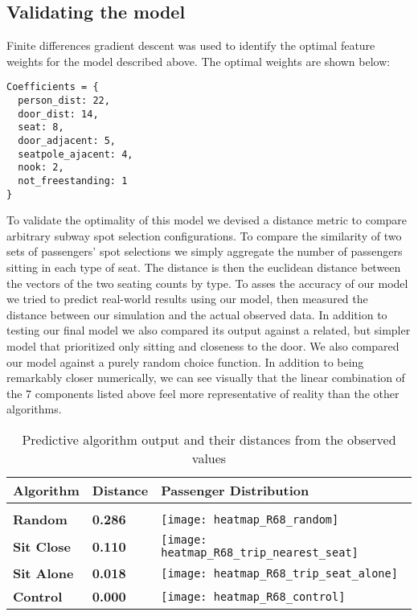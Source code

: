 \documentclass{acm_proc_article-sp}
\begin{document}
\subsection{Validating the model}
  Finite differences gradient descent\cite{flaxman2005online} was used to identify the optimal feature weights for the model described above. The optimal weights are shown below:
  \begin{lstlisting}
Coefficients = {
  person_dist: 22,
  door_dist: 14,
  seat: 8,
  door_adjacent: 5,
  seatpole_ajacent: 4,
  nook: 2,
  not_freestanding: 1
}
\end{lstlisting}

To validate the optimality of this model we devised a distance metric to compare arbitrary subway spot selection configurations. To compare the similarity of two sets of passengers' spot selections we simply aggregate the number of passengers sitting in each type of seat. The distance is then the euclidean distance between the vectors of the two seating counts by type. To asses the accuracy of our model we tried to predict real-world results using our model, then measured the distance between our simulation and the actual observed data. In addition to testing our final model we also compared its output against a related, but simpler model that prioritized only sitting and closeness to the door. We also compared our model against a purely random choice function. In addition to being remarkably closer numerically, we can see visually that the linear combination of the 7 components listed above feel more representative of reality than the other algorithms.

\begin{table*}[t]
  \caption{Predictive algorithm output and their distances from the observed values} \label{tab:compare_algos}
  \begin{tabular}
      {lll} \hline Algorithm & Distance & Passenger Distribution \\ \hline \\
      \textbf{Random} & \textbf{0.286} & \parbox[c]{1em}{ \texttt{[image: heatmap\_R68\_random]}} \\
      \textbf{Sit Close} & \textbf{0.110} & \parbox[c]{1em}{ \texttt{[image: heatmap\_R68\_trip\_nearest\_seat]}} \\
      \textbf{Sit Alone} & \textbf{0.018} & \parbox[c]{1em}{ \texttt{[image: heatmap\_R68\_trip\_seat\_alone]}} \\
      \textbf{Control} & \textbf{0.000} & \parbox[c]{1em}{ \texttt{[image: heatmap\_R68\_control]}} \\
 \end{tabular}
\end{table*}
\end{document}

